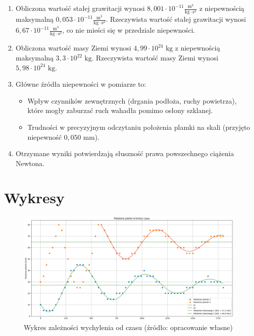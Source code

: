 \documentclass[a4paper,12pt]{article}
\begin{document}
\begin{enumerate}
    \item Obliczona wartość stałej grawitacji wynosi $8{,}001 \cdot 10^{-11} \frac{\text{m}^3}{\text{kg} \cdot \text{s}^2}$ z niepewnością maksymalną $0{,}053 \cdot 10^{-11} \frac{\text{m}^3}{\text{kg} \cdot \text{s}^2}$. Rzeczywista wartość stałej grawitacji wynosi $6{,}67 \cdot 10^{-11} \frac{\text{m}^3}{\text{kg} \cdot \text{s}^2}$, co nie mieści się w przedziale niepewności.

    \item Obliczona wartość masy Ziemi wynosi $4{,}99 \cdot 10^{24} \text{ kg}$ z niepewnością maksymalną $3{,}3 \cdot 10^{22} \text{ kg}$. Rzeczywista wartość masy Ziemi wynosi $5{,}98 \cdot 10^{24} \text{ kg}$.

    \item Główne źródła niepewności w pomiarze to:
          \begin{itemize}
              \item Wpływ czynników zewnętrznych (drgania podłoża, ruchy powietrza), które mogły zaburzać ruch wahadła pomimo osłony szklanej.
              \item Trudności w precyzyjnym odczytaniu położenia plamki na skali (przyjęto niepewność $0{,}050$ mm).
          \end{itemize}

    \item Otrzymane wyniki potwierdzają słuszność prawa powszechnego ciążenia Newtona.
\end{enumerate}
\newpage

\section{Wykresy}

\begin{figure}[H]
    \centering
    \includegraphics[width=0.9\textheight,angle=90]{wykres.png}
    \caption{Wykres zależności wychylenia od czasu (źródło: opracowanie własne)}
    \label{fig:wykres}
\end{figure}




\end{document}
